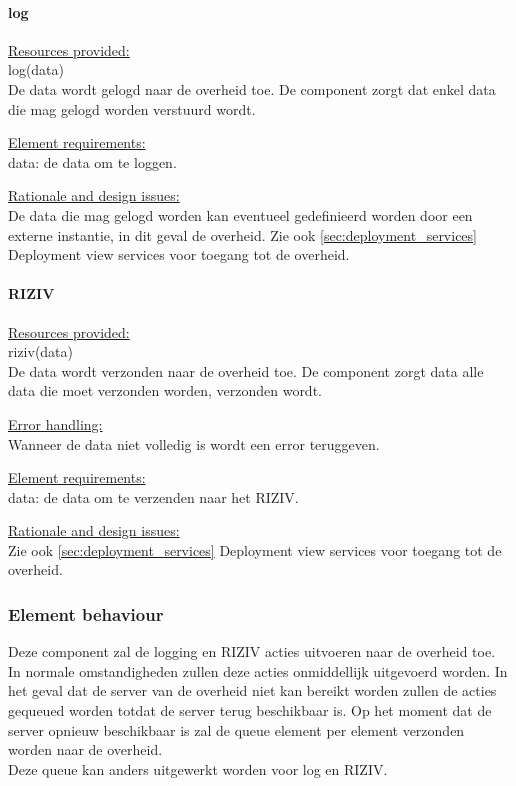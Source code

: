 \documentclass[a4paper,10pt]{article}
\begin{document}
\paragraph{log}
\underline{Resources provided:}\\
log(data)\\
De data wordt gelogd naar de overheid toe.  De component zorgt dat enkel data die mag gelogd worden verstuurd wordt.

\underline{Element requirements:}\\
data: de data om te loggen.

\underline{Rationale and design issues:}\\
De data die mag gelogd worden kan eventueel gedefinieerd worden door een externe instantie, in dit geval de overheid.
Zie ook \ref{sec:deployment_services} Deployment view services voor toegang tot de overheid.

\paragraph{RIZIV}
\underline{Resources provided:}\\
riziv(data)\\
De data wordt verzonden naar de overheid toe.  De component zorgt data alle data die moet verzonden worden, verzonden wordt.

\underline{Error handling:}\\
Wanneer de data niet volledig is wordt een error teruggeven.

\underline{Element requirements:}\\
data: de data om te verzenden naar het RIZIV.

\underline{Rationale and design issues:}\\
Zie ook \ref{sec:deployment_services} Deployment view services voor toegang tot de overheid.

\subsubsection{Element behaviour}
Deze component zal de logging en RIZIV acties uitvoeren naar de overheid toe.  In normale omstandigheden zullen deze acties onmiddellijk uitgevoerd worden.  In het geval dat de server van de overheid niet kan bereikt worden zullen de acties gequeued worden totdat de server terug beschikbaar is.  Op het moment dat de server opnieuw beschikbaar is zal de queue element per element verzonden worden naar de overheid.\\
Deze queue kan anders uitgewerkt worden voor log en RIZIV.
\end{document}
